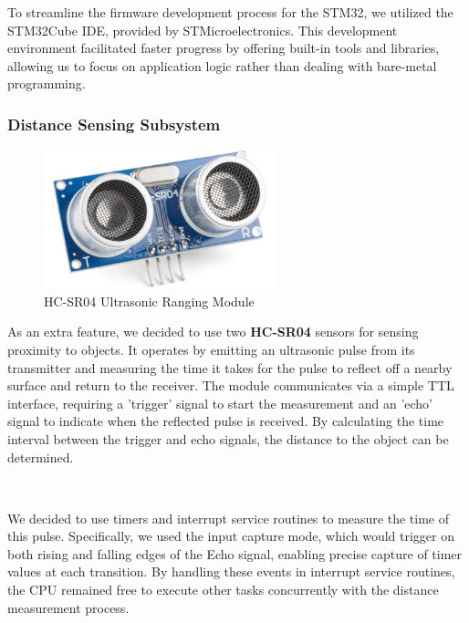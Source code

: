 \documentclass{article}
\begin{document}
To streamline the firmware development process for the STM32, we utilized the STM32Cube IDE, provided by STMicroelectronics. This development environment facilitated faster progress by offering built-in tools and libraries, allowing us to focus on application logic rather than dealing with bare-metal programming.



\subsubsection{Distance Sensing Subsystem}
\label{sec:distancesensor}

\begin{figure}[H]
    \centering
    \includegraphics[width=0.6\textwidth]{Figures/distancesensor.png} %
    \caption{HC-SR04 Ultrasonic Ranging Module}
    \label{fig:distancesensor}
\end{figure}

As an extra feature, we decided to use two \textbf{HC-SR04} sensors for sensing proximity to objects. It operates by emitting an ultrasonic pulse from its transmitter and measuring the time it takes for the pulse to reflect off a nearby surface and return to the receiver. The module communicates via a simple TTL interface, requiring a 'trigger' signal to start the measurement and an 'echo' signal to indicate when the reflected pulse is received. By calculating the time interval between the trigger and echo signals, the distance to the object can be determined.

\

We decided to use timers and interrupt service routines to measure the time of this pulse. Specifically, we used the input capture mode, which would trigger on both rising and falling edges of the Echo signal, enabling precise capture of timer values at each transition. By handling these events in interrupt service routines, the CPU remained free to execute other tasks concurrently with the distance measurement process.
\end{document}
